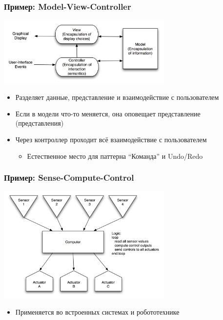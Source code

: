 \documentclass{../../slides-style}
\begin{document}
    \begin{frame}
        \frametitle{Пример: Model-View-Controller}
        \begin{center}
            \includegraphics[width=0.65\textwidth]{mvc.png}
        \end{center}
        \begin{itemize}
            \item Разделяет данные, представление и взаимодействие с пользователем
            \item Если в модели что-то меняется, она оповещает представление (представления)
            \item Через контроллер проходит всё взаимодействие с пользователем
            \begin{itemize}
                \item Естественное место для паттерна ``Команда'' и Undo/Redo
            \end{itemize}
        \end{itemize}
    \end{frame}

    \begin{frame}
        \frametitle{Пример: Sense-Compute-Control}
        \begin{center}
            \includegraphics[width=0.65\textwidth]{senseComputeControl.png}
        \end{center}
        \begin{itemize}
            \item Применяется во встроенных системах и робототехнике
        \end{itemize}
    \end{frame}
\end{document}
